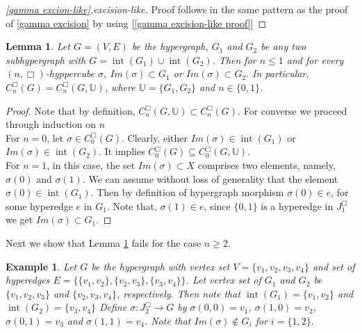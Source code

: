 \documentclass[11pt]{amsart}
\newtheorem{ex}[subsection]{Example}
\newtheorem{lem}[subsection]{Lemma}
\renewcommand{\int}{\operatorname{int}}
\begin{document}
\begin{proof}[\ref{gamma excion-like},excision-like]

Proof follows in the same pattern as the proof of \ref{gamma excision} by using [\ref{gamma excision-like proof}]

\end{proof}


\begin{lem}\label{box excision lemma}
Let $G=(V,E)$ be the hypergraph, $G_1$ and $G_2$ be any two subhypergraph with  $G=\int(G_1)\cup \int(G_2)$. Then for $n\leq 1$ and for every $(n,\Box)$-hyppercube $\sigma$, $Im(\sigma)\subset G_1$ or $Im(\sigma) \subset G_2.$ In particular, $C_n^\Box(G)=C_n^\Box(G,\mathbb{U})$, where $\mathbb{U}=\{G_1,G_2\}$ and $n\in\{0,1\}$.
\end{lem}


\begin{proof} Note that by definition, $C_n^\Box(G,\mathbb{U}) \subset C_n^\Box(G)$. For converse we proceed through induction on $n$\\


For $n=0$, let $\sigma \in  C_0^\Box(G)$. Clearly, either $Im(\sigma) \in \int(G_1)$ or $Im(\sigma) \in \int(G_2)$. It implies $C_0^\Box(G)\subseteq C_0^\Box(G,\mathbb{U})$.\\


For $n=1$, in this case, the set $Im(\sigma) \subset X$ comprises two elements, namely, $\sigma(0)$ and $\sigma(1)$. We can assume without loss of generality that the element $\sigma(0) \in \int(G_1)$. Then by definition of hypergraph morphism $\sigma(0)\in e$, for some hyperedge $e$ in $G_1.$ Note that, $\sigma(1)\in e$, since $\{0,1\}$ is a hyperedge in $J_1^\Box$ we get $Im(\sigma) \subset G_1$.
\end{proof}

Next we show that Lemma \ref{box excision lemma} fails for the case $n\ge 2$.

\begin{ex}
Let $G$ be the hypergraph with vertex set $V=\{v_1,v_2,v_3,v_4\}$ and set of hyperedges $E=\{\{v_1,v_2\} , \{v_2,v_3\}, \{v_3,v_4\}\}$. Let vertex set of $G_1$ and $G_2$ be $\{v_1,v_2,v_3\} $ and $ \{v_2,v_3,v_4\} $, respectively. Then note that $\int(G_1)=\{v_1,v_2\}$ and $\int(G_2)=\{v_3,v_4\}$ Define $\sigma: J_2^\Box \rightarrow G$ by $\sigma(0,0)=v_1$, $\sigma(1,0)=v_2$,  $\sigma(0,1)=v_3$ and $\sigma(1,1)=v_4$. Note that $Im(\sigma)\notin G_i$ for $i=\{1,2\}.$
\end{ex}
\end{document}
